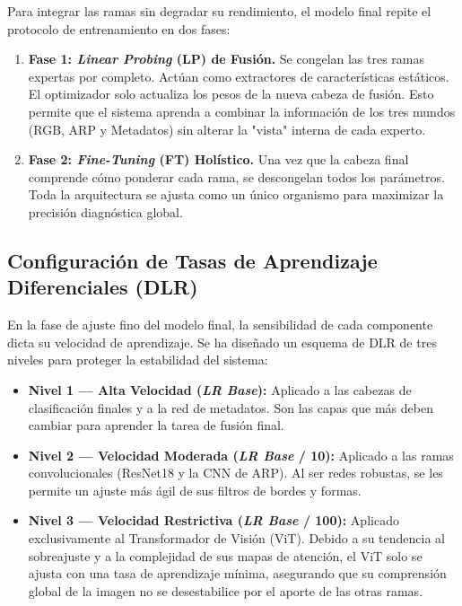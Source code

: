 Para integrar las ramas sin degradar su rendimiento, el modelo final repite el protocolo de entrenamiento en dos fases:

\begin{enumerate}
	\item \textbf{Fase 1: \textit{Linear Probing} (LP) de Fusión.} Se congelan las tres ramas expertas por completo. Actúan como extractores de características estáticos. El optimizador solo actualiza los pesos de la nueva cabeza de fusión. Esto permite que el sistema aprenda a combinar la información de los tres mundos (RGB, ARP y Metadatos) sin alterar la "vista" interna de cada experto.
	\item \textbf{Fase 2: \textit{Fine-Tuning} (FT) Holístico.} Una vez que la cabeza final comprende cómo ponderar cada rama, se descongelan todos los parámetros. Toda la arquitectura se ajusta como un único organismo para maximizar la precisión diagnóstica global.
\end{enumerate}

\subsection{Configuración de Tasas de Aprendizaje Diferenciales (DLR)}

En la fase de ajuste fino del modelo final, la sensibilidad de cada componente dicta su velocidad de aprendizaje. Se ha diseñado un esquema de DLR de tres niveles para proteger la estabilidad del sistema:

\begin{itemize}
	\item \textbf{Nivel 1 --- Alta Velocidad (\textit{LR Base}):} Aplicado a las cabezas de clasificación finales y a la red de metadatos. Son las capas que más deben cambiar para aprender la tarea de fusión final.
	\item \textbf{Nivel 2 --- Velocidad Moderada (\textit{LR Base} / 10):} Aplicado a las ramas convolucionales (ResNet18 y la CNN de ARP). Al ser redes robustas, se les permite un ajuste más ágil de sus filtros de bordes y formas.
	\item \textbf{Nivel 3 --- Velocidad Restrictiva (\textit{LR Base} / 100):} Aplicado exclusivamente al Transformador de Visión (ViT). Debido a su tendencia al sobreajuste y a la complejidad de sus mapas de atención, el ViT solo se ajusta con una tasa de aprendizaje mínima, asegurando que su comprensión global de la imagen no se desestabilice por el aporte de las otras ramas.
\end{itemize}
